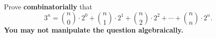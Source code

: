 \documentclass{article}
\theoremstyle{definition}
\begin{document}
\begin{question}{6}
    Prove \textbf{combinatorially} that
    \[ 3^n = \binom{n}{0} \cdot 2^0 + \binom{n}{1}\cdot 2^1+ \binom{n}{2}\cdot 2^2+\cdots +\binom{n}{n}\cdot 2^n. \]
    \textbf{You may not manipulate the question algebraically.}
\end{question}
\begin{solution}
\end{solution}
\end{document}
